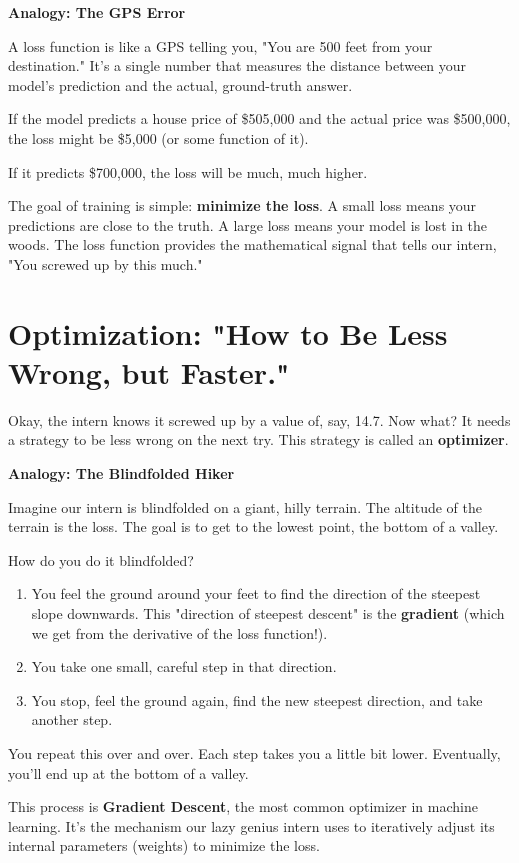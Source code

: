 \documentclass[11pt, letterpaper, openany]{book}
\begin{document}
\textbf{Analogy: The GPS Error}

A loss function is like a GPS telling you, "You are 500 feet from your destination." It's a single number that measures the distance between your model's prediction and the actual, ground-truth answer.

If the model predicts a house price of \$505,000 and the actual price was \$500,000, the loss might be \$5,000 (or some function of it).

If it predicts \$700,000, the loss will be much, much higher.

The goal of training is simple: \textbf{minimize the loss}. A small loss means your predictions are close to the truth. A large loss means your model is lost in the woods. The loss function provides the mathematical signal that tells our intern, "You screwed up by this much."

\section{Optimization: "How to Be Less Wrong, but Faster."}

Okay, the intern knows it screwed up by a value of, say, 14.7. Now what? It needs a strategy to be less wrong on the next try. This strategy is called an \textbf{optimizer}.

\textbf{Analogy: The Blindfolded Hiker}

Imagine our intern is blindfolded on a giant, hilly terrain. The altitude of the terrain is the loss. The goal is to get to the lowest point, the bottom of a valley.

How do you do it blindfolded?
\begin{enumerate}
    \item You feel the ground around your feet to find the direction of the steepest slope downwards. This "direction of steepest descent" is the \textbf{gradient} (which we get from the derivative of the loss function!).
    \item You take one small, careful step in that direction.
    \item You stop, feel the ground again, find the new steepest direction, and take another step.
\end{enumerate}
You repeat this over and over. Each step takes you a little bit lower. Eventually, you'll end up at the bottom of a valley.

This process is \textbf{Gradient Descent}, the most common optimizer in machine learning. It's the mechanism our lazy genius intern uses to iteratively adjust its internal parameters (weights) to minimize the loss.
\end{document}
